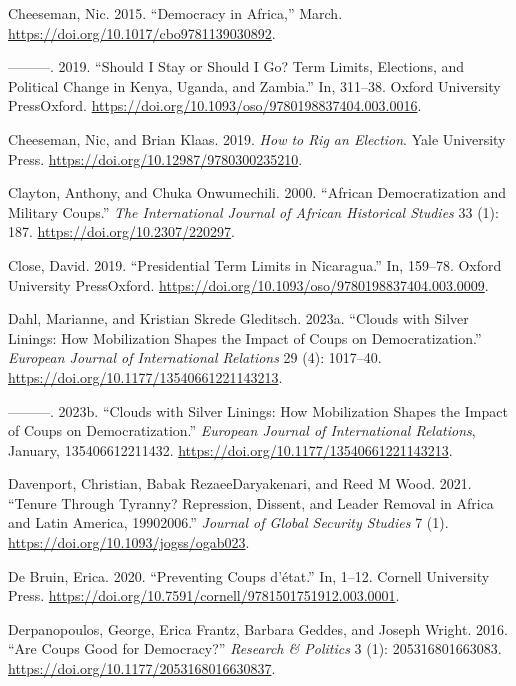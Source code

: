 \documentclass[
  12pt,
]{report}
\newlength{\cslhangindent}
\newenvironment{CSLReferences}[2] %
 {\begin{list}{}{%
  \setlength{\itemindent}{0pt}
  \setlength{\leftmargin}{0pt}
  \setlength{\parsep}{0pt}
  \ifodd #1
   \setlength{\leftmargin}{\cslhangindent}
   \setlength{\itemindent}{-1\cslhangindent}
  \fi
  \setlength{\itemsep}{#2\baselineskip}}}
 {\end{list}}
\begin{document}
\begin{CSLReferences}{1}{0}
Cheeseman, Nic. 2015. {``Democracy in Africa,''} March.
\url{https://doi.org/10.1017/cbo9781139030892}.

---------. 2019. {``Should I Stay or Should I Go? Term Limits,
Elections, and Political Change in Kenya, Uganda, and Zambia.''} In,
311--38. Oxford University PressOxford.
\url{https://doi.org/10.1093/oso/9780198837404.003.0016}.

Cheeseman, Nic, and Brian Klaas. 2019. \emph{How to Rig an Election}.
Yale University Press. \url{https://doi.org/10.12987/9780300235210}.

Clayton, Anthony, and Chuka Onwumechili. 2000. {``African
Democratization and Military Coups.''} \emph{The International Journal
of African Historical Studies} 33 (1): 187.
\url{https://doi.org/10.2307/220297}.

Close, David. 2019. {``Presidential Term Limits in Nicaragua.''} In,
159--78. Oxford University PressOxford.
\url{https://doi.org/10.1093/oso/9780198837404.003.0009}.

Dahl, Marianne, and Kristian Skrede Gleditsch. 2023a. {``Clouds with
Silver Linings: How Mobilization Shapes the Impact of Coups on
Democratization.''} \emph{European Journal of International Relations}
29 (4): 1017--40. \url{https://doi.org/10.1177/13540661221143213}.

---------. 2023b. {``Clouds with Silver Linings: How Mobilization Shapes
the Impact of Coups on Democratization.''} \emph{European Journal of
International Relations}, January, 135406612211432.
\url{https://doi.org/10.1177/13540661221143213}.

Davenport, Christian, Babak RezaeeDaryakenari, and Reed M Wood. 2021.
{``Tenure Through Tyranny? Repression, Dissent, and Leader Removal in
Africa and Latin America, 1990{\textendash}2006.''} \emph{Journal of
Global Security Studies} 7 (1).
\url{https://doi.org/10.1093/jogss/ogab023}.

De Bruin, Erica. 2020. {``Preventing Coups d{'}état.''} In, 1--12.
Cornell University Press.
\url{https://doi.org/10.7591/cornell/9781501751912.003.0001}.

Derpanopoulos, George, Erica Frantz, Barbara Geddes, and Joseph Wright.
2016. {``Are Coups Good for Democracy?''} \emph{Research \& Politics} 3
(1): 205316801663083. \url{https://doi.org/10.1177/2053168016630837}.


\end{CSLReferences}
\end{document}
